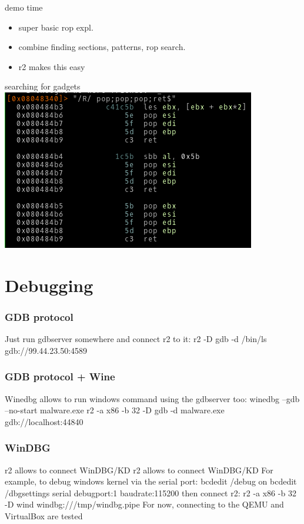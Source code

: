 \documentclass[10pt,pdf,utf8,english,compress,hyperref={unicode}]{beamer}
\begin{document}
\begin{frame}{demo time}
	\begin{itemize}
			\item super basic rop expl.
			\item combine finding sections, patterns, rop search.
			\item r2 makes this easy
	\end{itemize}
\end{frame}

\begin{frame}{searching for gadgets}
	\includegraphics[width=\textwidth]{crimages/poppopret.png}
\end{frame}

\section{Debugging}
\begin{frame}[fragile]
  \frametitle{GDB protocol}
  \center Just run gdbserver somewhere
  \center and connect r2 to it:
  \center r2 -D gdb -d /bin/ls gdb://99.44.23.50:4589
\end{frame}

\begin{frame}[fragile]
  \frametitle{GDB protocol + Wine}
  \center Winedbg allows to run windows command
  \center using the gdbserver too:
  \center winedbg --gdb --no-start malware.exe
  \center r2 -a x86 -b 32 -D gdb -d malware.exe gdb://localhost:44840
\end{frame}

\begin{frame}[fragile]
  \frametitle{WinDBG}
\ifxetex
  \center r2 allows to connect WinDBG/KD
\else
  \center r2 allows to connect WinDBG/KD 
\fi
  \center For example, to debug windows kernel via the serial port:
  \center bcdedit /debug on
  \center bcdedit /dbgsettings serial debugport:1 baudrate:115200
  \center then connect r2:
  \center r2 -a x86 -b 32 -D wind windbg:///tmp/windbg.pipe
  \center For now, connecting to the QEMU and VirtualBox are tested
\end{frame}
\end{document}
